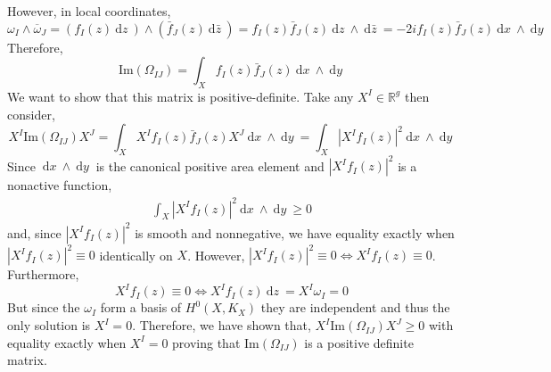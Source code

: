 \documentclass[12pt]{extarticle}
\newcommand{\R}{\mathbb{R}}
\renewcommand{\Im}[1]{\mathrm{Im}(#1)}
\renewcommand{\d}[1]{\: \mathrm{d}#1 \:}
\theoremstyle{definition}
\begin{document}
However, in local coordinates,
\[ \omega_I \wedge \overline{\omega}_J = (f_I(z) \d{z}) \wedge (\bar{f}_J(z) \d{\bar{z}}) = f_I(z) \bar{f}_J(z) \d{z} \wedge \d{\bar{z}} = - 2i f_I(z) \bar{f}_J(z) \d{x} \wedge \d{y} \]
Therefore,
\[ \Im{\Omega_{IJ}} = \int_X f_I(z) \bar{f}_J(z) \d{x} \wedge \d{y} \]
We want to show that this matrix is positive-definite. Take any $X^I \in \R^g$ then consider,
\[ X^I \Im{\Omega_{IJ}} X^J = \int_X X^I f_I(z) \bar{f}_J(z) X^J \d{x} \wedge \d{y} = \int_X \left| X^I f_I(z) \right|^2 \d{x} \wedge \d{y} \]
Since $\d{x} \wedge \d{y}$ is the canonical positive area element and $|X^I f_I(z)|^2$ is a nonactive function,  
\begin{align*}
\int_X \left| X^I f_I(z) \right|^2 \d{x} \wedge \d{y} \ge 0 
\end{align*}
and, since $\left| X^I f_I(z) \right|^2$ is smooth and nonnegative, we have equality exactly when $\left| X^I f_I(z) \right|^2 \equiv 0$ identically on $X$. However, $\left| X^I f_I(z) \right|^2 \equiv 0 \iff X^I f_I(z) \equiv 0$. Furthermore,
\[ X^I f_I(z) \equiv 0 \iff X^I f_I(z) \d{z} = X^I \omega_I = 0 \]
But since the $\omega_I$ form a basis of $H^0(X, K_X)$ they are independent and thus the only solution is $X^I = 0$. Therefore, we have shown that, $X^I \Im{\Omega_{IJ}} X^J \ge  0$ with equality exactly when $X^I = 0$ proving that $\Im{\Omega_{IJ}}$ is a positive definite matrix.  
\end{document}

